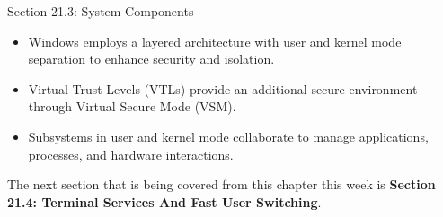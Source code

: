 \begin{notes}{Section 21.3: System Components}
    \begin{highlight}
        \begin{itemize}
            \item Windows employs a layered architecture with user and kernel mode separation to enhance security and isolation.
            \item Virtual Trust Levels (VTLs) provide an additional secure environment through Virtual Secure Mode (VSM).
            \item Subsystems in user and kernel mode collaborate to manage applications, processes, and hardware interactions.
        \end{itemize}
    \end{highlight}
\end{notes}

The next section that is being covered from this chapter this week is \textbf{Section 21.4: Terminal Services And Fast User Switching}.

